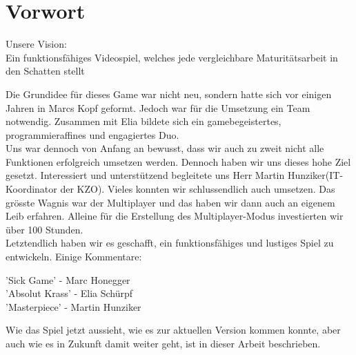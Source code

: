 \chapter{Vorwort}
\begin{center}
    Unsere Vision:\\
    Ein funktionsfähiges Videospiel, welches jede vergleichbare Maturitätsarbeit in den Schatten stellt\\
\end{center}
Die Grundidee für dieses Game war nicht neu, sondern hatte sich vor einigen Jahren in Marcs Kopf geformt.
Jedoch war für die Umsetzung ein Team notwendig. Zusammen mit Elia bildete sich ein gamebegeistertes, programmieraffines und engagiertes Duo.\\
Uns war dennoch von Anfang an bewusst,
dass wir auch zu zweit nicht alle Funktionen erfolgreich umsetzen werden. Dennoch haben wir uns dieses hohe Ziel gesetzt. Interessiert und 
unterstützend begleitete uns Herr Martin Hunziker(IT-Koordinator der KZO).
Vieles konnten wir schlussendlich auch umsetzen.
Das grösste Wagnis war der Multiplayer und das haben wir dann auch an eigenem Leib erfahren.
Alleine für die Erstellung des Multiplayer-Modus investierten wir über 100 Stunden.\\
Letztendlich haben wir es geschafft, ein funktionsfähiges und lustiges Spiel zu entwickeln.
Einige Kommentare:
\begin{center}
    'Sick Game' - Marc Honegger \\
    'Absolut Krass' - Elia Schürpf \\ 
    'Masterpiece' - Martin Hunziker
\end{center}
Wie das Spiel jetzt aussieht, wie es zur aktuellen Version kommen konnte, aber auch wie es in Zukunft damit weiter geht, ist in dieser Arbeit beschrieben.
